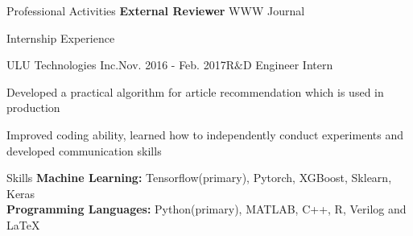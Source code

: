 \documentclass{resume} %
\begin{document}
\vspace{-20pt}
\begin{rSection}{Professional Activities}
\textbf{External Reviewer} \hfill WWW Journal
\end{rSection}


\begin{rSection}{Internship Experience}
\begin{rSubsection}{ULU Technologies Inc.}{Nov. 2016 - Feb. 2017}{R$\&$D  Engineer Intern}{}
\item Developed a practical algorithm for article recommendation which is used in production 
\item Improved coding ability, learned how to independently conduct experiments and developed communication skills
\end{rSubsection}
\end{rSection}






\begin{rSection}{Skills}
{\bf Machine Learning: }
\hspace*{3.0 cm} Tensorflow(primary), Pytorch, XGBoost, Sklearn, Keras\\
{\bf Programming Languages: }
\hspace*{1.8 cm} Python(primary), MATLAB, C++, R, Verilog and \LaTeX  \\
\end{rSection}


\clearpage
\end{document}
